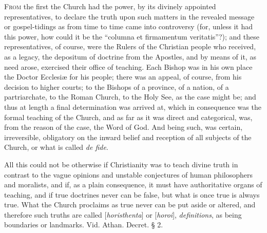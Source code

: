 
F\textsc{rom} the first the Church
had the power, by its divinely appointed representatives, to declare
the truth upon such matters in the revealed message or gospel-tidings
as from time to time came into controversy (for, unless it had this
power, how could it be the ``columna et firmamentum veritatis''?); and
these representatives, of course, were the Rulers of the Christian
people who received, as a legacy, the depositum of doctrine from the
Apostles, and by means of it, as need arose, exercised their office of
teaching. Each Bishop was in his own place the Doctor Ecclesiæ for
his people; there was an appeal, of course, from his decision to
higher courts; to the Bishops of a province, of a nation, of a
partriarchate, to the Roman Church, to the Holy See, as the case might
be; and thus at length a final determination was arrived at, which in
consequence was the formal teaching of the Church, and as far as it
was direct and categorical, was, from the reason of the case, the Word
of God. And being such, was certain, irreversible, obligatory on the
inward belief and reception of all subjects of the Church, or what is
called \emph{de fide}.

All this could not be otherwise if Christianity
was to teach divine truth in contrast to the vague opinions and
unstable conjectures of human philosophers and moralists, and if,
as a plain consequence, it must have authoritative organs of teaching,
and if true doctrines never can be false, but what is once true is
always true. What the Church proclaims as true never can be put aside
or altered, and therefore such truths are called [\emph{horisthenta}]
or [\emph{horoi}], \emph{definitions},
as being boundaries or landmarks. Vid. Athan. Decret. § 2.

